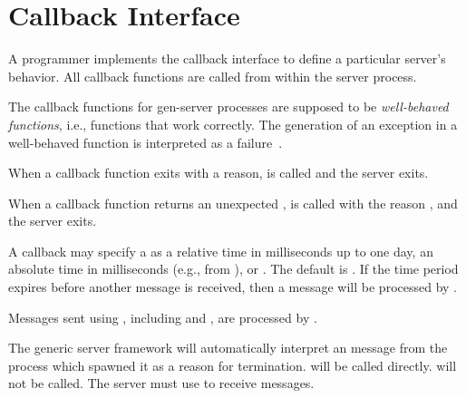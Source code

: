 \section {Callback Interface}

A programmer implements the callback interface to define a particular
server's behavior. All callback functions are called from within the
server process.

The callback functions for gen-server processes are supposed to be
\emph{well-behaved functions}, i.e., functions that work
correctly. The generation of an exception in a well-behaved function
is interpreted as a failure~\cite{armstrong-thesis}.

When a callback function exits with a reason,  is
called and the server exits.

When a callback function returns an unexpected ,
 is called with the reason
, and the server exits.

A callback may specify a  as a relative time in
milliseconds up to one day, an absolute time in milliseconds (e.g.,
from ), or . The default
 is . If the time period expires before
another message is received, then a  message will be
processed by .

Messages sent using , including  and , are processed by .

The generic server framework will automatically interpret an
 message from the process which spawned it as a reason
for termination.  will be called
directly.  will not be called. The server must use
 to receive  messages.

\begin{procedure}
\end{procedure}
\returns{}

\begin{argtbl}
\end{argtbl}

